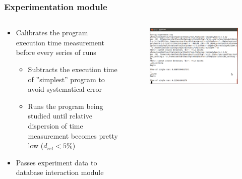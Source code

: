 \documentclass{beamer}
\begin{document}
\begin{frame}
\frametitle{Experimentation module}

	\begin{columns}[T]
		\begin{column}{0.5\textwidth}
			\begin{itemize}
				\item Calibrates the program execution time measurement before every series of runs
				\begin{itemize}
					\item Subtracts the execution time of ''simplest'' program to avoid systematical error
					\item Runs the program being studied until relative  dispersion of time measurement becomes pretty low ($d_{rel} < 5\%$)
				\end{itemize}
				\item Passes experiment data to database interaction module
			\end{itemize}
		\end{column}
		\begin{column}{0.5\textwidth}
			\begin{figure}
				\includegraphics[width=\textwidth]{console}
			\end{figure}
		\end{column}
	\end{columns}

\end{frame}
\end{document}

